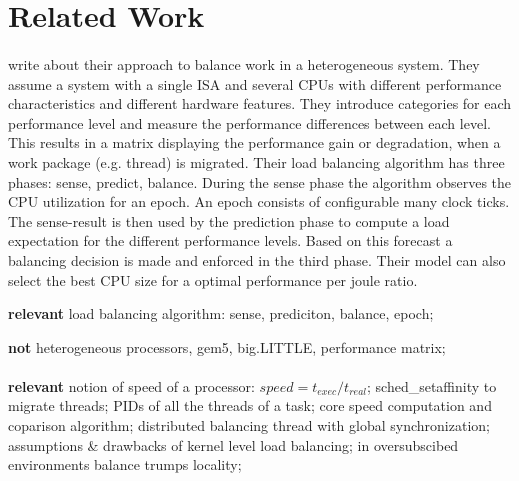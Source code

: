 \section{Related Work}
\label{state:related}

\begin{comment}
  Structure for the description of related work:
    * Assumptions
    * Concept
    * Relevant contribution
    * Result
    * Deficits
\end{comment}


\paragraph{ \cite{sarma_smartbalance_2015} }
\citeauthor{sarma_smartbalance_2015} write about their approach to balance work
in a heterogeneous system.
They assume a system with a single ISA and several CPUs with different performance
characteristics and different hardware features.
They introduce categories for each performance level and measure the
performance differences between each level.
This results in a matrix displaying the performance gain or degradation, when
a work package (e.g. thread) is migrated.
Their load balancing algorithm has three phases: sense, predict, balance.
During the sense phase the algorithm observes the CPU utilization for an epoch.
An epoch consists of configurable many clock ticks.
The sense-result is then used by the prediction phase to compute a load
expectation for the different performance levels.
Based on this forecast a balancing decision is made and enforced in the third
phase.
Their model can also select the best CPU size for a optimal performance per
joule ratio.

\textbf{ relevant } load balancing algorithm: sense, prediciton, balance,
epoch;

\textbf{ not} heterogeneous processors, gem5, big.LITTLE, performance
matrix;

\paragraph{ \cite{hofmeyr_load_2010} }

\textbf{ relevant } notion of speed of a processor: $speed = t_{exec}/t_{real}$;
sched\_setaffinity to migrate threads; PIDs of all the threads of a task;
core speed computation and coparison algorithm;
distributed balancing thread with global synchronization;
assumptions \& drawbacks of kernel level load balancing;
in oversubscibed environments balance trumps locality;


